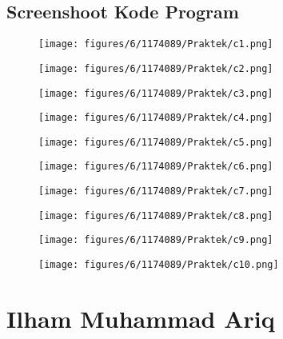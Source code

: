 \subsection{Screenshoot Kode Program}
\begin{figure}[H]
	\texttt{[image: figures/6/1174089/Praktek/c1.png]}
	\centering
\end{figure}
\begin{figure}[H]
	\texttt{[image: figures/6/1174089/Praktek/c2.png]}
	\centering
\end{figure}
\begin{figure}[H]
	\texttt{[image: figures/6/1174089/Praktek/c3.png]}
	\centering
\end{figure}
\begin{figure}[H]
	\texttt{[image: figures/6/1174089/Praktek/c4.png]}
	\centering
\end{figure}
\begin{figure}[H]
	\texttt{[image: figures/6/1174089/Praktek/c5.png]}
	\centering
\end{figure}
\begin{figure}[H]
	\texttt{[image: figures/6/1174089/Praktek/c6.png]}
	\centering
\end{figure}
\begin{figure}[H]
	\texttt{[image: figures/6/1174089/Praktek/c7.png]}
	\centering
\end{figure}
\begin{figure}[H]
	\texttt{[image: figures/6/1174089/Praktek/c8.png]}
	\centering
\end{figure}
\begin{figure}[H]
	\texttt{[image: figures/6/1174089/Praktek/c9.png]}
	\centering
\end{figure}
\begin{figure}[H]
	\texttt{[image: figures/6/1174089/Praktek/c10.png]}
	\centering
\end{figure}

\section{Ilham Muhammad Ariq}
